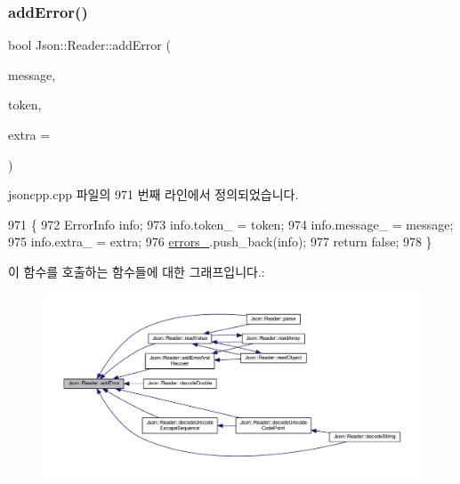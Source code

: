 \subsubsection{\texorpdfstring{add\+Error()}{addError()}}
{\footnotesize\ttfamily bool Json\+::\+Reader\+::add\+Error (\begin{DoxyParamCaption}\item[{const \hyperlink{json_8h_a1e723f95759de062585bc4a8fd3fa4be}{J\+S\+O\+N\+C\+P\+P\+\_\+\+S\+T\+R\+I\+NG} \&}]{message,  }\item[{\hyperlink{class_json_1_1_reader_1_1_token}{Token} \&}]{token,  }\item[{\hyperlink{class_json_1_1_reader_a46795b5b272bf79a7730e406cb96375a}{Location}}]{extra = {} }\end{DoxyParamCaption})\hspace{0.3cm}{\ttfamily [private]}}



jsoncpp.\+cpp 파일의 971 번째 라인에서 정의되었습니다.


\begin{DoxyCode}
971                                                                             \{
972   ErrorInfo info;
973   info.token\_ = token;
974   info.message\_ = message;
975   info.extra\_ = extra;
976   \hyperlink{class_json_1_1_reader_a1bbce45dc4df753bed60c129f4b5147c}{errors\_}.push\_back(info);
977   \textcolor{keywordflow}{return} \textcolor{keyword}{false};
978 \}
\end{DoxyCode}
이 함수를 호출하는 함수들에 대한 그래프입니다.\+:\nopagebreak
\begin{figure}[H]
\begin{center}
\leavevmode
\includegraphics[width=350pt]{class_json_1_1_reader_af02176a1d2786b4415bbb00a1b10bb6b_icgraph}
\end{center}
\end{figure}
\mbox{\label{class_json_1_1_reader_a478db8ac6d00db1409608a37b66bc38d}} 
